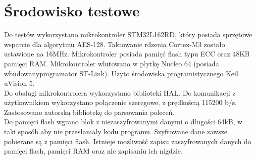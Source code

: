\documentclass[a4paper, 10pt]{article}
\begin{document}
	\section{Środowisko testowe}
	Do testów wykorzystano mikrokontroler STM32L162RD\cite{bib:STM}, który posiada sprzętowe wsparcie dla algorytmu AES-128. Taktowanie rdzenia Cortex-M3 zostało ustawione na 16MHz. Mikrokontroler posiada pamięć flash typu ECC oraz 48KB pamięci RAM. Mikrokontroler wlutowano w płytkę Nucleo 64 (posiada wbudowanyprogramator ST-Link). Użyto środowiska programistycznego Keil uVision 5.\\
	Do obsługi mikrokontrolera wykorzystano biblioteki HAL. Do komunikacji z użytkownikiem wykorzystano połączenie szeregowe, z prędkością 115200 b/s. Zastosowano autorską bibliotekę do parsowania poleceń.\\
	Do pamięci flash wgrano blok z niezaszyfrowanymi danymi o długości 64kB, w taki sposób aby nie przesłaniały kodu programu. Szyfrowane dane zawsze pobierane są z pamięci flash. Istnieje możliwość zapisu zaszyfrowanych danych do pamięci flash, pamięci RAM oraz nie zapisaniu ich nigdzie.
	
\end{document}
